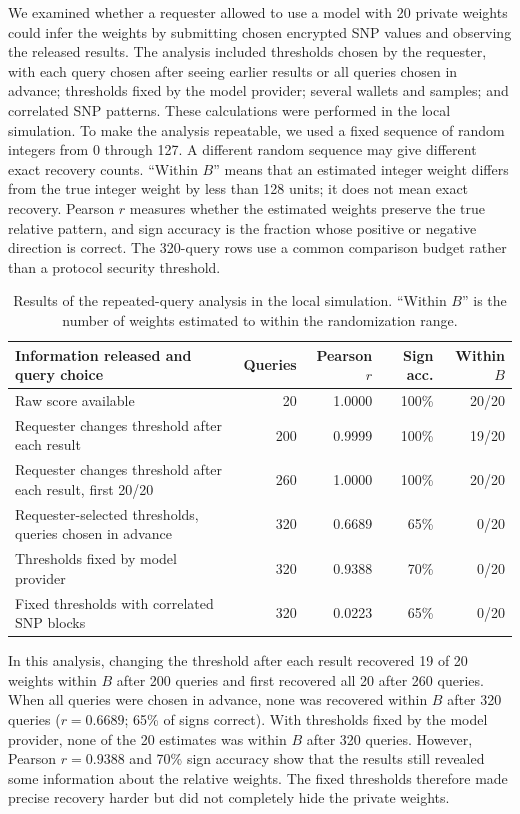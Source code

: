 \documentclass[10pt]{article}
\begin{document}
We examined whether a requester allowed to use a model with 20 private weights could
infer the weights by submitting chosen encrypted SNP values and observing the released
results.  The analysis included thresholds chosen by the requester, with each query
chosen after seeing earlier results or all queries chosen in advance; thresholds fixed
by the model provider; several wallets and samples; and correlated SNP patterns.  These
calculations were performed in the local simulation.  To make the analysis repeatable,
we used a fixed sequence of random integers from 0 through 127. A different
random sequence may give different exact recovery counts.
``Within $B$'' means that an estimated integer weight differs from the true integer weight
by less than 128 units; it does not mean exact recovery.  Pearson $r$ measures whether the
estimated weights preserve the true relative pattern, and sign accuracy is the fraction
whose positive or negative direction is correct.  The 320-query rows use a common comparison
budget rather than a protocol security threshold.

\begin{table}[t]
\centering
\caption{Results of the repeated-query analysis in the local simulation. ``Within
$B$'' is the number of weights estimated to within the randomization range.}
\label{tab:probing}
\small
\begin{tabularx}{\textwidth}{@{}Xrrrr@{}}
\toprule
\textbf{Information released and query choice} & \textbf{Queries} & \textbf{Pearson $r$} & \textbf{Sign acc.} & \textbf{Within $B$} \\
\midrule
Raw score available & 20 & 1.0000 & 100\% & 20/20 \\
Requester changes threshold after each result & 200 & 0.9999 & 100\% & 19/20 \\
Requester changes threshold after each result, first 20/20 & 260 & 1.0000 & 100\% & 20/20 \\
Requester-selected thresholds, queries chosen in advance & 320 & 0.6689 & 65\% & 0/20 \\
Thresholds fixed by model provider & 320 & 0.9388 & 70\% & 0/20 \\
Fixed thresholds with correlated SNP blocks & 320 & 0.0223 & 65\% & 0/20 \\
\bottomrule
\end{tabularx}
\end{table}

In this analysis, changing the threshold after each result recovered 19 of 20 weights
within $B$ after 200 queries and first recovered all 20 after 260 queries. When all
queries were chosen in advance, none was recovered within $B$ after 320 queries
($r=0.6689$; 65\% of signs correct). With thresholds fixed by the model provider, none
of the 20 estimates was within $B$ after 320 queries.  However, Pearson $r=0.9388$ and
70\% sign accuracy show that the results still revealed some information about the
relative weights.  The fixed thresholds therefore made precise recovery harder but did
not completely hide the private weights.
\end{document}
